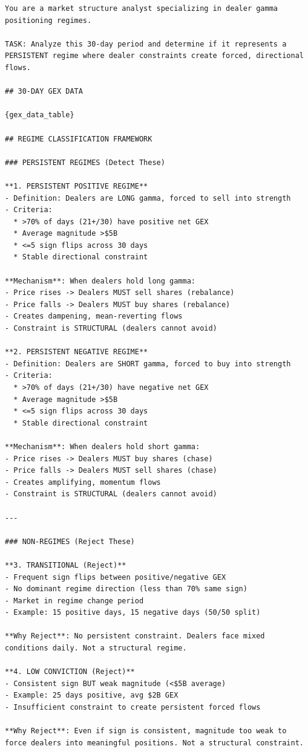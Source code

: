 \documentclass[jrfm,article,accept,moreauthors,pdftex]{Definitions/mdpi}
\begin{document}
\begin{verbatim}
You are a market structure analyst specializing in dealer gamma
positioning regimes.

TASK: Analyze this 30-day period and determine if it represents a
PERSISTENT regime where dealer constraints create forced, directional
flows.

## 30-DAY GEX DATA

{gex_data_table}

## REGIME CLASSIFICATION FRAMEWORK

### PERSISTENT REGIMES (Detect These)

**1. PERSISTENT POSITIVE REGIME**
- Definition: Dealers are LONG gamma, forced to sell into strength
- Criteria:
  * >70% of days (21+/30) have positive net GEX
  * Average magnitude >$5B
  * <=5 sign flips across 30 days
  * Stable directional constraint

**Mechanism**: When dealers hold long gamma:
- Price rises -> Dealers MUST sell shares (rebalance)
- Price falls -> Dealers MUST buy shares (rebalance)
- Creates dampening, mean-reverting flows
- Constraint is STRUCTURAL (dealers cannot avoid)

**2. PERSISTENT NEGATIVE REGIME**
- Definition: Dealers are SHORT gamma, forced to buy into strength
- Criteria:
  * >70% of days (21+/30) have negative net GEX
  * Average magnitude >$5B
  * <=5 sign flips across 30 days
  * Stable directional constraint

**Mechanism**: When dealers hold short gamma:
- Price rises -> Dealers MUST buy shares (chase)
- Price falls -> Dealers MUST sell shares (chase)
- Creates amplifying, momentum flows
- Constraint is STRUCTURAL (dealers cannot avoid)

---

### NON-REGIMES (Reject These)

**3. TRANSITIONAL (Reject)**
- Frequent sign flips between positive/negative GEX
- No dominant regime direction (less than 70% same sign)
- Market in regime change period
- Example: 15 positive days, 15 negative days (50/50 split)

**Why Reject**: No persistent constraint. Dealers face mixed
conditions daily. Not a structural regime.

**4. LOW CONVICTION (Reject)**
- Consistent sign BUT weak magnitude (<$5B average)
- Example: 25 days positive, avg $2B GEX
- Insufficient constraint to create persistent forced flows

**Why Reject**: Even if sign is consistent, magnitude too weak to
force dealers into meaningful positions. Not a structural constraint.


\end{verbatim}
\end{document}
